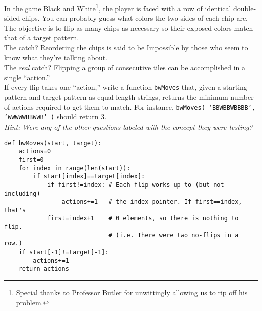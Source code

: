 In the game Black and White\footnote{Special thanks to Professor Butler for unwittingly allowing us to rip off his problem.}, the player is faced with a row of identical double-sided chips.
You can probably guess what colors the two sides of each chip are.
The objective is to flip as many chips as necessary so their exposed colors match that of a target pattern. \\
The catch?
Reordering the chips is said to be Impossible by those who seem to know what they're talking about. \\
The \textit{real} catch?
Flipping a group of consecutive tiles can be accomplished in a single ``action.'' \\
If every flip takes one ``action,'' write a function \texttt{bwMoves} that, given a starting pattern and target pattern as equal-length strings, returns the minimum number of actions required to get them to match.
For instance, \texttt{bwMoves( 'BBWBBWBBBB', 'WWWWWBBWWB' )} should return 3.
\vspace{6pt} \\
\textit{Hint: Were any of the other questions labeled with the concept they were testing?}
\begin{answer}
\begin{lstlisting}
def bwMoves(start, target):
	actions=0
	first=0
	for index in range(len(start)):
		if start[index]==target[index]:
			if first!=index: # Each flip works up to (but not including)
				actions+=1	 # the index pointer. If first==index, that's
			first=index+1	 # 0 elements, so there is nothing to flip.
							 # (i.e. There were two no-flips in a row.)
	if start[-1]!=target[-1]:
		actions+=1
	return actions
\end{lstlisting}
\end{answer}